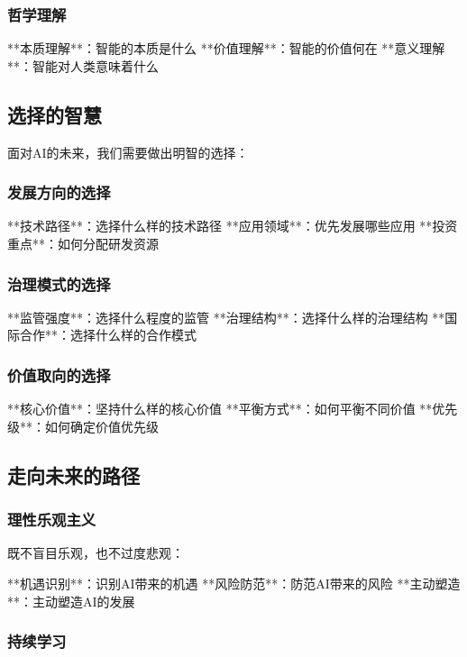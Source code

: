 \subsubsection{哲学理解}

**本质理解**：智能的本质是什么
**价值理解**：智能的价值何在
**意义理解**：智能对人类意味着什么

\subsection{选择的智慧}

面对AI的未来，我们需要做出明智的选择：

\subsubsection{发展方向的选择}

**技术路径**：选择什么样的技术路径
**应用领域**：优先发展哪些应用
**投资重点**：如何分配研发资源

\subsubsection{治理模式的选择}

**监管强度**：选择什么程度的监管
**治理结构**：选择什么样的治理结构
**国际合作**：选择什么样的合作模式

\subsubsection{价值取向的选择}

**核心价值**：坚持什么样的核心价值
**平衡方式**：如何平衡不同价值
**优先级**：如何确定价值优先级

\subsection{走向未来的路径}

\subsubsection{理性乐观主义}

既不盲目乐观，也不过度悲观：

**机遇识别**：识别AI带来的机遇
**风险防范**：防范AI带来的风险
**主动塑造**：主动塑造AI的发展

\subsubsection{持续学习}


